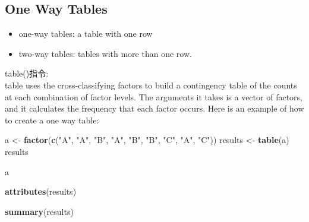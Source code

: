 \documentclass[]{book}
\newenvironment{Shaded}{\begin{snugshade}}{\end{snugshade}}
\newcommand{\KeywordTok}[1]{\textcolor[rgb]{0.13,0.29,0.53}{\textbf{#1}}}
\newcommand{\NormalTok}[1]{#1}
\newcommand{\StringTok}[1]{\textcolor[rgb]{0.31,0.60,0.02}{#1}}
\providecommand{\tightlist}{%
  \setlength{\itemsep}{0pt}\setlength{\parskip}{0pt}}
\theoremstyle{definition}
\theoremstyle{definition}
\theoremstyle{definition}
\theoremstyle{remark}
\begin{document}
\hypertarget{one-way-tables}{%
\subsection{One Way Tables}\label{one-way-tables}}

\begin{itemize}
\tightlist
\item
  one-way tables: a table with one row
\item
  two-way tables: tables with more than one row.
\end{itemize}

table()指令:\\
table uses the cross-classifying factors to build a contingency table of
the counts at each combination of factor levels. The arguments it takes
is a vector of factors, and it calculates the frequency that each factor
occurs. Here is an example of how to create a one way table:

\begin{Shaded}
\begin{Highlighting}[]
\NormalTok{a <-}\StringTok{ }\KeywordTok{factor}\NormalTok{(}\KeywordTok{c}\NormalTok{(}\StringTok{"A"}\NormalTok{, }\StringTok{"A"}\NormalTok{, }\StringTok{"B"}\NormalTok{, }\StringTok{"A"}\NormalTok{, }\StringTok{"B"}\NormalTok{, }\StringTok{"B"}\NormalTok{, }\StringTok{"C"}\NormalTok{, }\StringTok{"A"}\NormalTok{, }\StringTok{"C"}\NormalTok{))}
\NormalTok{results <-}\StringTok{ }\KeywordTok{table}\NormalTok{(a)}
\NormalTok{results}
\end{Highlighting}
\end{Shaded}

\begin{Shaded}
\begin{Highlighting}[]
\NormalTok{a}
\end{Highlighting}
\end{Shaded}

\begin{Shaded}
\begin{Highlighting}[]
\KeywordTok{attributes}\NormalTok{(results)}
\end{Highlighting}
\end{Shaded}

\begin{Shaded}
\begin{Highlighting}[]
\KeywordTok{summary}\NormalTok{(results)}
\end{Highlighting}
\end{Shaded}
\end{document}
